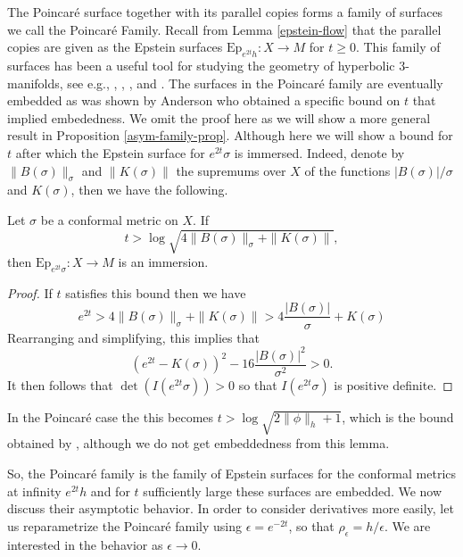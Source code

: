 The Poincar\'e surface together with its parallel copies forms a family of surfaces we call the Poincar\'e Family. 
Recall from Lemma \ref{epstein-flow} that the parallel copies are given as the Epstein surfaces $\mathrm{Ep}_{e^{2t}h}: X \to M$ for $t \geq 0$. 
This family of surfaces has been a useful tool for studying the geometry of hyperbolic 3-manifolds, see e.g., \cite{anderson1998}, \cite{bromberg2004}, \cite{krasnov-schlenker2008}, and \cite{bridgeman-brock-bromberg2019}.
The surfaces in the Poincar\'e family are eventually embedded as was shown by Anderson \cite{anderson1998} who obtained a specific bound on $t$ that implied embededness. 
We omit the proof here as we will show a more general result in Proposition \ref{asym-family-prop}. 
Although here we will show a bound for $t$ after which the Epstein surface for $e^{2t}\sigma$ is immersed. 
Indeed, denote by $\|B(\sigma)\|_\sigma$ and $\|K(\sigma)\|$ the supremums over $X$ of the functions $|B(\sigma)|/\sigma$ and $K(\sigma)$, then we have the following.

\begin{lem}\label{parallel-family-immersed}
Let $\sigma$ be a conformal metric on $X$. 
If 
\[
t > \log  \sqrt{ 4 \|B(\sigma)\|_\sigma + \|K(\sigma)\|},
\]
then $\mathrm{Ep}_{e^{2t}\sigma}: X \to M$ is an immersion.
\end{lem}

\begin{proof}
If $t$ satisfies this bound then we have
\[
e^{2t} > 4 \|B(\sigma)\|_\sigma + \|K(\sigma)\| > 4 \frac{|B(\sigma)|}{\sigma} + K(\sigma)
\]
Rearranging and simplifying, this implies that 
\[
(e^{2t} - K(\sigma))^2 - 16\frac{|B(\sigma)|^2}{\sigma^2} > 0.
\]
It then follows that $\det(I(e^{2t}\sigma)) > 0$ so that $I(e^{2t}\sigma)$ is positive definite. 
\end{proof}

In the Poincar\'e case the this becomes $t > \log \sqrt{2\|\phi\|_h + 1}$, which is the bound obtained by \cite{anderson1998}, although we do not get embeddedness from this lemma. 

So, the Poincar\'e family is the family of Epstein surfaces for the conformal metrics at infinity $e^{2t}h$ and for $t$ sufficiently large these surfaces are embedded. 
We now discuss their asymptotic behavior. 
In order to consider derivatives more easily, let us reparametrize the Poincar\'e family using $\epsilon = e^{-2t}$, so that $\rho_\epsilon = h/\epsilon$. 
We are interested in the behavior as $\epsilon \to 0$. 

